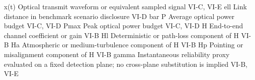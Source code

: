 {}\markdownRendererPipe{} \markdownRendererDollarSign{}x(t)\markdownRendererDollarSign{} \markdownRendererPipe{} Optical transmit waveform or equivalent sampled signal \markdownRendererPipe{} VI-C, VI-E \markdownRendererPipe{}\markdownRendererSoftLineBreak
{}\markdownRendererPipe{} \markdownRendererDollarSign{}\markdownRendererBackslash{}ell\markdownRendererDollarSign{} \markdownRendererPipe{} Link distance in benchmark scenario disclosure \markdownRendererPipe{} VI-D \markdownRendererPipe{}\markdownRendererSoftLineBreak
{}\markdownRendererPipe{} \markdownRendererDollarSign{}\markdownRendererBackslash{}bar P\markdownRendererDollarSign{} \markdownRendererPipe{} Average optical power budget \markdownRendererPipe{} VI-C, VI-D \markdownRendererPipe{}\markdownRendererSoftLineBreak
{}\markdownRendererPipe{} \markdownRendererDollarSign{}P\markdownRendererUnderscore{}\markdownRendererLeftBrace{}\markdownRendererBackslash{}max\markdownRendererRightBrace{}\markdownRendererDollarSign{} \markdownRendererPipe{} Peak optical power budget \markdownRendererPipe{} VI-C, VI-D \markdownRendererPipe{}\markdownRendererSoftLineBreak
{}\markdownRendererPipe{} \markdownRendererDollarSign{}H\markdownRendererDollarSign{} \markdownRendererPipe{} End-to-end channel coefficient or gain \markdownRendererPipe{} VI-B \markdownRendererPipe{}\markdownRendererSoftLineBreak
{}\markdownRendererPipe{} \markdownRendererDollarSign{}H\markdownRendererUnderscore{}l\markdownRendererDollarSign{} \markdownRendererPipe{} Deterministic or path-loss component of \markdownRendererDollarSign{}H\markdownRendererDollarSign{} \markdownRendererPipe{} VI-B \markdownRendererPipe{}\markdownRendererSoftLineBreak
{}\markdownRendererPipe{} \markdownRendererDollarSign{}H\markdownRendererUnderscore{}a\markdownRendererDollarSign{} \markdownRendererPipe{} Atmospheric or medium-turbulence component of \markdownRendererDollarSign{}H\markdownRendererDollarSign{} \markdownRendererPipe{} VI-B \markdownRendererPipe{}\markdownRendererSoftLineBreak
{}\markdownRendererPipe{} \markdownRendererDollarSign{}H\markdownRendererUnderscore{}p\markdownRendererDollarSign{} \markdownRendererPipe{} Pointing or misalignment component of \markdownRendererDollarSign{}H\markdownRendererDollarSign{} \markdownRendererPipe{} VI-B \markdownRendererPipe{}\markdownRendererSoftLineBreak
{}\markdownRendererPipe{} \markdownRendererDollarSign{}\markdownRendererBackslash{}gamma\markdownRendererDollarSign{} \markdownRendererPipe{} Instantaneous reliability proxy evaluated on a fixed detection plane; no cross-plane substitution is implied \markdownRendererPipe{} VI-B, VI-E \markdownRendererPipe{}\markdownRendererSoftLineBreak

